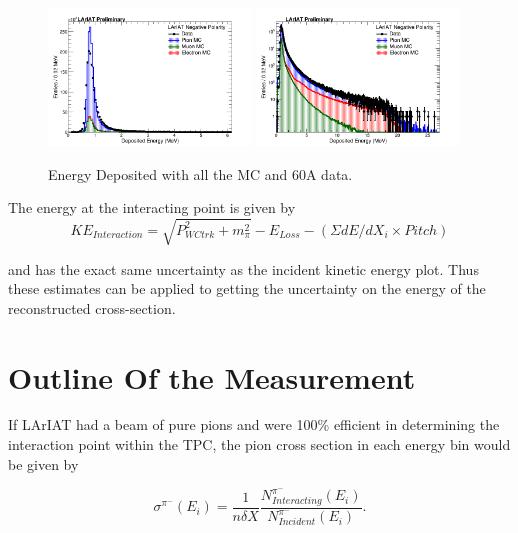 \begin{figure}[htb]
\centering
\includegraphics[width=0.48\textwidth]{Studies/Figures/DepEnergy_Stacked_v1.png}
\includegraphics[width=0.48\textwidth]{Studies/Figures/DepEnergy_Stacked_v3.png}
\caption[]{ Energy Deposited with all the MC and 60A data.  } \label{fig:EnergyDepositedStacked}
\end{figure}

The energy at the interacting point is given by
\begin{equation}
KE_{Interaction} = \sqrt{P_{WCtrk}^2 + m_{\pi}^2} - E_{Loss} - (\Sigma dE/dX_{i} \times Pitch)
\end{equation}

and has the exact same uncertainty as the incident kinetic energy plot. Thus these estimates can be applied to getting the uncertainty on the energy of the reconstructed cross-section.


\newpage
\section{Outline Of the Measurement}
If LArIAT had a beam of pure pions and were 100\% efficient in determining the interaction point within the TPC, the pion cross section in each energy bin would be given by

\begin{equation}
 \sigma^{\pi^-}(E_{i})  = \frac{1}{n \delta X}\frac{N^{\pi^-}_{Interacting} (E_{i})}{N^{\pi^-}_{Incident}(E_{i})}.
\label{eq:thinTargetXSSolved}
\end{equation}

